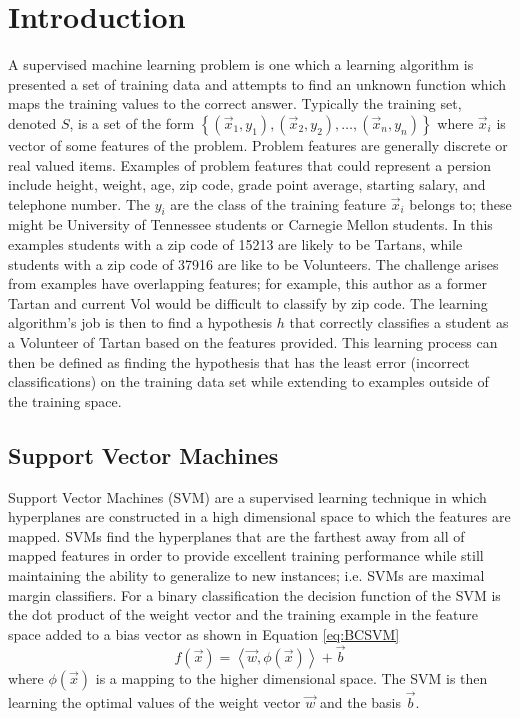 \section{Introduction}

A supervised machine learning problem is one which a learning algorithm is presented a set of training data and attempts to find an unknown function which maps the training values to the correct answer.
Typically the training set, denoted $S$, is a set of the form $\left \{ (\vec{x}_1,y_1), (\vec{x}_2,y_2), \dots, (\vec{x}_n,y_n) \right \}$ where $\vec{x}_i$ is vector of some features of the problem.
Problem features are generally discrete or real valued items.
Examples of problem features that could represent a persion include height, weight, age, zip code, grade point average, starting salary, and telephone number.
The $y_i$ are the class of the training feature $\vec{x}_i$ belongs to; these might be University of Tennessee students or Carnegie Mellon students.
In this examples students with a zip code of 15213 are likely to be Tartans, while students with a zip code of 37916 are like to be Volunteers.
The challenge arises from examples have overlapping features; for example, this author as a former Tartan and current Vol would be difficult to classify by zip code.
The learning algorithm's job is then to find a hypothesis $h$ that correctly classifies a student as a Volunteer of Tartan based on the features provided.
This learning process can then be defined as finding the hypothesis that has the least error (incorrect classifications) on the training data set while extending to examples outside of the training space.

\subsection{Support Vector Machines}
Support Vector Machines (SVM) are a supervised learning technique in which hyperplanes are constructed in a high dimensional space to which the features are mapped.
SVMs find the hyperplanes that are the farthest away from all of mapped features in order to provide excellent training performance while still maintaining the ability to generalize to new instances; i.e. SVMs are maximal margin classifiers.
For a binary classification the decision function of the SVM is the dot product of the weight vector and the training example in the feature space added to a bias vector as shown in Equation \ref{eq:BCSVM}
\begin{equation}
\label{eq:BCSVM}
f \left ( \vec{x} \right ) = \left \langle \vec{w} , \phi(\vec{x}) \right \rangle + \vec{b}
\end{equation}
where $\phi(\vec{x})$ is a mapping to the higher dimensional space.
The SVM is then learning the optimal values of the weight vector $\vec{w}$ and the basis $\vec{b}$.

